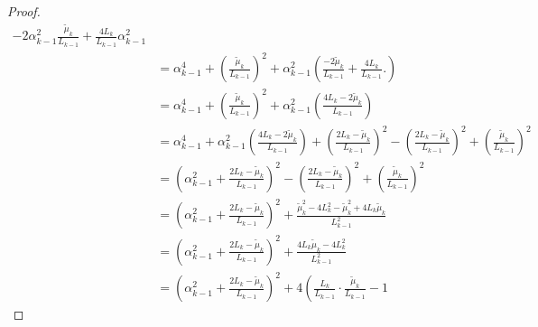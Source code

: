 \documentclass[12pt]{article}
\begin{document}
\begin{proof}
\begin{align*}
                - 2\alpha_{k - 1}^2 \frac{\tilde \mu_k}{L_{k - 1}} 
                + \frac{4L_k}{L_{k - 1}}\alpha_{k - 1}^2
                \\
                &= \alpha_{k - 1}^4 + \left(\frac{\tilde \mu_k}{L_{k - 1}}\right)^2
                + \alpha_{k - 1}^2 \left(
                    \frac{-2\tilde \mu_k}{L_{k - 1}} + \frac{4L_k}{L_{k - 1}}. 
                \right)
                \\
                &= \alpha_{k - 1}^4 + \left(\frac{\tilde \mu_k}{L_{k - 1}}\right)^2
                + \alpha_{k - 1}^2 \left(
                    \frac{4L_k - 2\tilde \mu_k}{L_{k - 1}}
                \right)
                \\
                &= \alpha_{k - 1}^4
                + \alpha_{k - 1}^2 \left(
                    \frac{4L_k - 2\tilde \mu_k}{L_{k - 1}}
                \right) 
                + \left(
                    \frac{2L_k - \tilde \mu_k}{L_{k - 1}}
                \right)^2
                - \left(
                    \frac{2L_k - \tilde \mu_k}{L_{k - 1}}
                \right)^2
                + \left(\frac{\tilde \mu_k}{L_{k - 1}}\right)^2
                \\
                &= \left(
                    \alpha_{k - 1}^2 + 
                    \frac{2L_k - \tilde \mu_k}{L_{k - 1}}
                \right)^2
                - \left(
                    \frac{2L_k - \tilde \mu_k}{L_{k - 1}}
                \right)^2
                + \left(\frac{\tilde \mu_k}{L_{k - 1}}\right)^2
                \\
                &= 
                \left(
                    \alpha_{k - 1}^2 + 
                    \frac{2L_k - \tilde \mu_k}{L_{k - 1}}
                \right)^2
                + 
                \frac{
                    \tilde \mu_k^2 - 4L_k^2 - \tilde \mu_k^2 + 4L_k\tilde \mu_k
                }{L_{k - 1}^2}
                \\
                &= 
                \left(
                    \alpha_{k - 1}^2 + 
                    \frac{2L_k - \tilde \mu_k}{L_{k - 1}}
                \right)^2
                + 
                \frac{
                    4L_k \tilde \mu_k - 4L_k^2
                }{L_{k - 1}^2}
                \\
                &= 
                \left(
                    \alpha_{k - 1}^2 + 
                    \frac{2L_k - \tilde \mu_k}{L_{k - 1}}
                \right)^2
                + 
                4\left(
                    \frac{L_k}{L_{k - 1}}\cdot \frac{\tilde \mu_k}{L_{k - 1}} - 1

\end{align*}
\end{proof}
\end{document}
